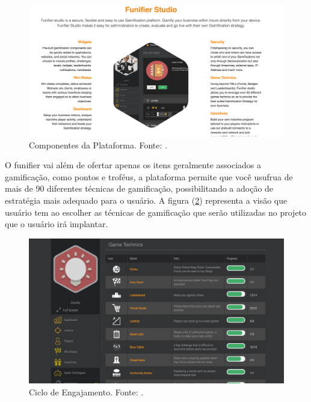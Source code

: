 \begin{figure}[h]
	\centering
		\includegraphics[keepaspectratio=true,scale=0.3]{figuras/funifier.png}
	\caption{Componentes da Plataforma. Fonte: \cite{kumar2013gamification}.\label{funifier}
}
\end{figure}

\newpage

O funifier vai além de ofertar apenas os itens geralmente associados a gamificação, como pontos e troféus, a plataforma permite que você usufrua de mais de 90 diferentes técnicas de gamificação, possibilitando a adoção de estratégia mais adequado para o usuário. A figura (\ref{tecnicas}) representa a visão que usuário tem ao escolher as técnicas de gamificação que serão utilizadas no projeto que o usuário irá implantar.



\begin{figure}[h]
	\centering
		\includegraphics[keepaspectratio=true,scale=0.3]{figuras/tecniques.png}
	\caption{Ciclo de Engajamento. Fonte: \cite{kumar2013gamification}.\label{tecnicas}
}
\end{figure}


